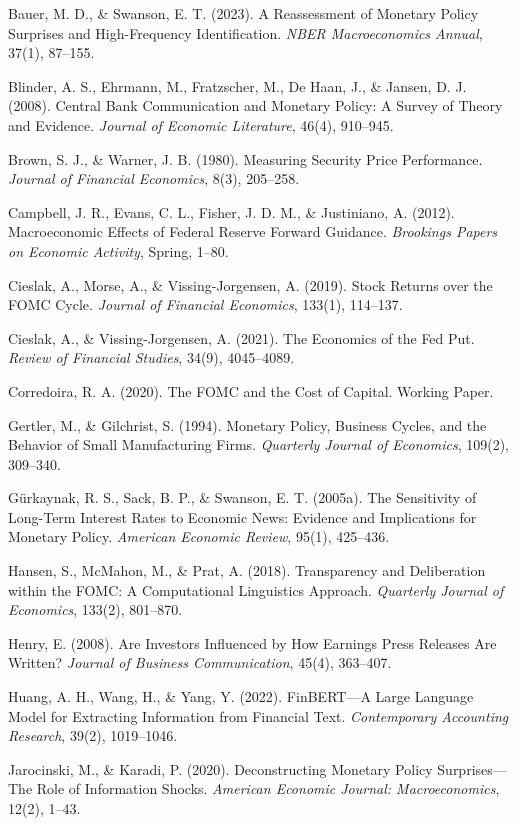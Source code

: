 \documentclass[12pt]{article}
\begin{document}
Bauer, M. D., \& Swanson, E. T. (2023). A Reassessment of Monetary Policy Surprises and High-Frequency Identification. \textit{NBER Macroeconomics Annual}, 37(1), 87--155.

Blinder, A. S., Ehrmann, M., Fratzscher, M., De Haan, J., \& Jansen, D. J. (2008). Central Bank Communication and Monetary Policy: A Survey of Theory and Evidence. \textit{Journal of Economic Literature}, 46(4), 910--945.

Brown, S. J., \& Warner, J. B. (1980). Measuring Security Price Performance. \textit{Journal of Financial Economics}, 8(3), 205--258.

Campbell, J. R., Evans, C. L., Fisher, J. D. M., \& Justiniano, A. (2012). Macroeconomic Effects of Federal Reserve Forward Guidance. \textit{Brookings Papers on Economic Activity}, Spring, 1--80.

Cieslak, A., Morse, A., \& Vissing-Jorgensen, A. (2019). Stock Returns over the FOMC Cycle. \textit{Journal of Financial Economics}, 133(1), 114--137.

Cieslak, A., \& Vissing-Jorgensen, A. (2021). The Economics of the Fed Put. \textit{Review of Financial Studies}, 34(9), 4045--4089.

Corredoira, R. A. (2020). The FOMC and the Cost of Capital. Working Paper.

Gertler, M., \& Gilchrist, S. (1994). Monetary Policy, Business Cycles, and the Behavior of Small Manufacturing Firms. \textit{Quarterly Journal of Economics}, 109(2), 309--340.

G\"urkaynak, R. S., Sack, B. P., \& Swanson, E. T. (2005a). The Sensitivity of Long-Term Interest Rates to Economic News: Evidence and Implications for Monetary Policy. \textit{American Economic Review}, 95(1), 425--436.

Hansen, S., McMahon, M., \& Prat, A. (2018). Transparency and Deliberation within the FOMC: A Computational Linguistics Approach. \textit{Quarterly Journal of Economics}, 133(2), 801--870.

Henry, E. (2008). Are Investors Influenced by How Earnings Press Releases Are Written? \textit{Journal of Business Communication}, 45(4), 363--407.

Huang, A. H., Wang, H., \& Yang, Y. (2022). FinBERT---A Large Language Model for Extracting Information from Financial Text. \textit{Contemporary Accounting Research}, 39(2), 1019--1046.

Jarocinski, M., \& Karadi, P. (2020). Deconstructing Monetary Policy Surprises---The Role of Information Shocks. \textit{American Economic Journal: Macroeconomics}, 12(2), 1--43.
\end{document}

